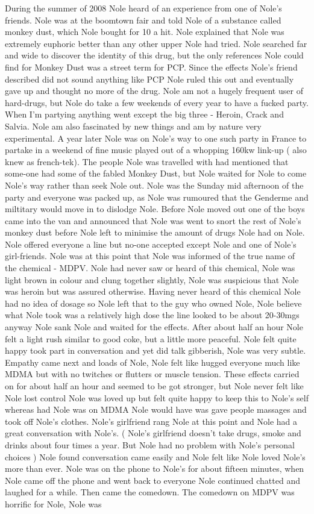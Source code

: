 \documentclass[12pt]{book}
\begin{document}
During the summer of 2008 Nole heard of an experience from one of Nole's friends. Nole was at the boomtown fair and told Nole of a substance called monkey dust, which Nole bought for 10 a hit. Nole explained that Nole was extremely euphoric better than any other upper Nole had tried. Nole searched far and wide to discover the identity of this drug, but the only references Nole could find for Monkey Dust was a street term for PCP. Since the effects Nole's friend described did not sound anything like PCP Nole ruled this out and eventually gave up and thought no more of the drug. Nole am not a hugely frequent user of hard-drugs, but Nole do take a few weekends of every year to have a fucked party. When I'm partying anything went except the big three - Heroin, Crack and Salvia. Nole am also fascinated by new things and am by nature very experimental. A year later Nole was on Nole's way to one such party in France to partake in a weekend of fine music played out of a whopping 160kw link-up ( also knew as french-tek). The people Nole was travelled with had mentioned that some-one had some of the fabled Monkey Dust, but Nole waited for Nole to come Nole's way rather than seek Nole out. Nole was the Sunday mid afternoon of the party and everyone was packed up, as Nole was rumoured that the Genderme and miltitary would move in to dislodge Nole. Before Nole moved out one of the boys came into the van and announced that Nole was went to snort the rest of Nole's monkey dust before Nole left to minimise the amount of drugs Nole had on Nole. Nole offered everyone a line but no-one accepted except Nole and one of Nole's girl-friends. Nole was at this point that Nole was informed of the true name of the chemical - MDPV. Nole had never saw or heard of this chemical, Nole was light brown in colour and clung together slightly, Nole was suspicious that Nole was heroin but was assured otherwise. Having never heard of this chemical Nole had no idea of dosage so Nole left that to the guy who owned Nole, Nole believe what Nole took was a relatively high dose the line looked to be about 20-30mgs anyway Nole sank Nole and waited for the effects. After about half an hour Nole felt a light rush similar to good coke, but a little more peaceful. Nole felt quite happy took part in conversation and yet did talk gibberish, Nole was very subtle. Empathy came next and loads of Nole, Nole felt like hugged everyone much like MDMA but with no twitches or flutters or muscle tension. These effects carried on for about half an hour and seemed to be got stronger, but Nole never felt like Nole lost control Nole was loved up but felt quite happy to keep this to Nole's self whereas had Nole was on MDMA Nole would have was gave people massages and took off Nole's clothes. Nole's girlfriend rang Nole at this point and Nole had a great conversation with Nole's. ( Nole's girlfriend doesn't take drugs, smoke and drinks about four times a year. But Nole had no problem with Nole's personal choices ) Nole found conversation came easily and Nole felt like Nole loved Nole's more than ever. Nole was on the phone to Nole's for about fifteen minutes, when Nole came off the phone and went back to everyone Nole continued chatted and laughed for a while. Then came the comedown. The comedown on MDPV was horrific for Nole, Nole was 
\end{document}
